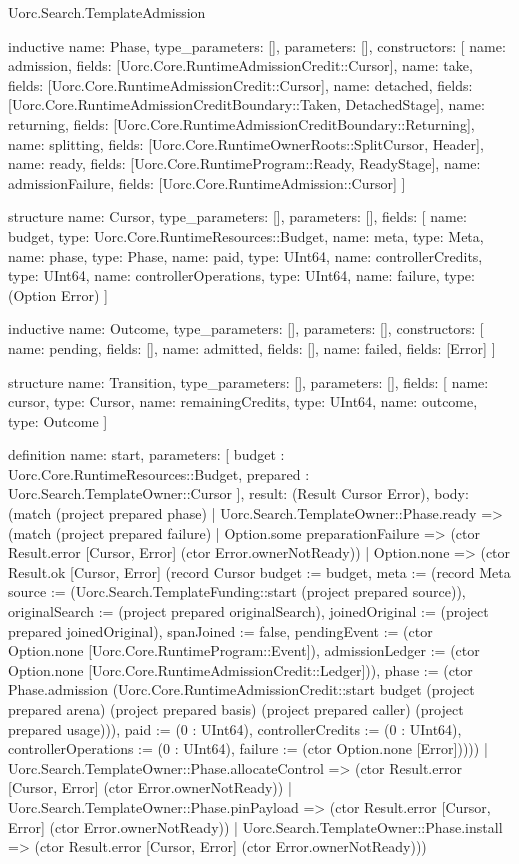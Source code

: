 \begin{lexlean}{Uorc.Search.TemplateAdmission}
\begin{semanticmodule}
inductive{
  name: Phase,
  type_parameters: [],
  parameters: [],
  constructors: [
    {name: admission, fields: [Uorc.Core.RuntimeAdmissionCredit::Cursor]},
    {name: take, fields: [Uorc.Core.RuntimeAdmissionCredit::Cursor]},
    {name: detached, fields: [Uorc.Core.RuntimeAdmissionCreditBoundary::Taken, DetachedStage]},
    {name: returning, fields: [Uorc.Core.RuntimeAdmissionCreditBoundary::Returning]},
    {name: splitting, fields: [Uorc.Core.RuntimeOwnerRoots::SplitCursor, Header]},
    {name: ready, fields: [Uorc.Core.RuntimeProgram::Ready, ReadyStage]},
    {name: admissionFailure, fields: [Uorc.Core.RuntimeAdmission::Cursor]}
  ]
}

structure{
  name: Cursor,
  type_parameters: [],
  parameters: [],
  fields: [
    {name: budget, type: Uorc.Core.RuntimeResources::Budget},
    {name: meta, type: Meta},
    {name: phase, type: Phase},
    {name: paid, type: UInt64},
    {name: controllerCredits, type: UInt64},
    {name: controllerOperations, type: UInt64},
    {name: failure, type: (Option Error)}
  ]
}

inductive{
  name: Outcome,
  type_parameters: [],
  parameters: [],
  constructors: [
    {name: pending, fields: []},
    {name: admitted, fields: []},
    {name: failed, fields: [Error]}
  ]
}

structure{
  name: Transition,
  type_parameters: [],
  parameters: [],
  fields: [
    {name: cursor, type: Cursor},
    {name: remainingCredits, type: UInt64},
    {name: outcome, type: Outcome}
  ]
}

definition{
  name: start,
  parameters: [
    budget : Uorc.Core.RuntimeResources::Budget,
    prepared : Uorc.Search.TemplateOwner::Cursor
  ],
  result: (Result Cursor Error),
  body: (match (project prepared phase)
    | Uorc.Search.TemplateOwner::Phase.ready => (match (project prepared failure)
      | Option.some preparationFailure => (ctor Result.error [Cursor, Error] (ctor Error.ownerNotReady))
      | Option.none => (ctor Result.ok [Cursor, Error] (record Cursor {budget := budget, meta := (record Meta {source := (Uorc.Search.TemplateFunding::start (project prepared source)), originalSearch := (project prepared originalSearch), joinedOriginal := (project prepared joinedOriginal), spanJoined := false, pendingEvent := (ctor Option.none [Uorc.Core.RuntimeProgram::Event]), admissionLedger := (ctor Option.none [Uorc.Core.RuntimeAdmissionCredit::Ledger])}), phase := (ctor Phase.admission (Uorc.Core.RuntimeAdmissionCredit::start budget (project prepared arena) (project prepared basis) (project prepared caller) (project prepared usage))), paid := (0 : UInt64), controllerCredits := (0 : UInt64), controllerOperations := (0 : UInt64), failure := (ctor Option.none [Error])})))
    | Uorc.Search.TemplateOwner::Phase.allocateControl => (ctor Result.error [Cursor, Error] (ctor Error.ownerNotReady))
    | Uorc.Search.TemplateOwner::Phase.pinPayload => (ctor Result.error [Cursor, Error] (ctor Error.ownerNotReady))
    | Uorc.Search.TemplateOwner::Phase.install => (ctor Result.error [Cursor, Error] (ctor Error.ownerNotReady)))
}


\end{semanticmodule}
\end{lexlean}
